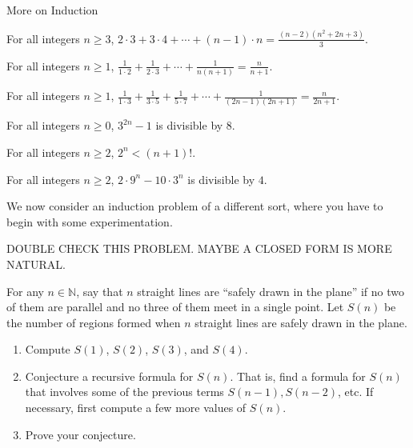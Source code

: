\begin{section}{More on Induction}
\begin{theorem}
For all integers $n \ge 3$, $\displaystyle{2\cdot 3 + 3 \cdot 4 + \cdots + (n-1)\cdot n = \frac{(n-2)(n^2+2n+3)}{3}}$.
\end{theorem}

\begin{theorem}
For all integers $n \ge 1$, $\displaystyle{\frac{1}{1\cdot 2} + \frac{1}{2\cdot 3} + \cdots + \frac{1}{n(n+1)} = \frac{n}{n+1}}$.
\end{theorem}

\begin{theorem}
For all integers $n \ge 1$, $\displaystyle{\frac{1}{1\cdot 3} + \frac{1}{3\cdot 5} + \frac{1}{5\cdot7} + \cdots + \frac{1}{(2n-1)(2n+1)} = \frac{n}{2n+1}}$.
\end{theorem}

\begin{theorem}\label{thm:3^{2n}-1 div by 8}
For all integers $n \ge 0$, $3^{2n}-1$ is divisible by $8$.
\end{theorem}

\begin{theorem}
For all integers $n \ge 2$, $2^n < (n+1)!$.
\end{theorem}

\begin{theorem}
For all integers $n \ge 2$, $2\cdot 9^n - 10 \cdot 3^n$ is divisible by $4$.
\end{theorem}

We now consider an induction problem of a different sort, where you have to begin with some experimentation.

DOUBLE CHECK THIS PROBLEM.  MAYBE A CLOSED FORM IS MORE NATURAL.

\begin{problem}
For any $n \in \mathbb{N}$, say that $n$ straight lines are ``safely drawn in the plane'' if no two of them are parallel and no three of them meet in a single point. Let $S(n)$ be the number of regions formed when $n$ straight lines are safely drawn in the plane.
\begin{enumerate}[label=\textrm{(\alph*)}]
\item Compute $S(1)$, $S(2)$, $S(3)$, and $S(4)$.
\item Conjecture a recursive formula for $S(n)$. That is, find a formula for $S(n)$ that involves some of the previous terms $S(n-1), S(n-2)$, etc. If necessary, first compute a few more values of $S(n)$.
\item Prove your conjecture.
\end{enumerate}
\end{problem}


\end{section}
